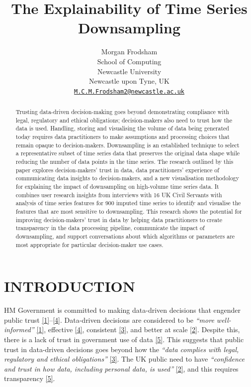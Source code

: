\documentclass{article}
\title{The Explainability of Time Series Downsampling}
\author{
    Morgan Frodsham
   \\
    School of Computing \\
    Newcastle University \\
  Newcastle upon Tyne, UK \\
  \texttt{\href{mailto:M.C.M.Frodsham2@newcastle.ac.uk}{\nolinkurl{M.C.M.Frodsham2@newcastle.ac.uk}}} \\
  }
\begin{document}
\maketitle


\begin{abstract}
Trusting data-driven decision-making goes beyond demonstrating
compliance with legal, regulatory and ethical obligations;
decision-makers also need to trust how the data is used. Handling,
storing and visualising the volume of data being generated today
requires data practitioners to make assumptions and processing choices
that remain opaque to decision-makers. Downsampling is an established
technique to select a representative subset of time series data that
preserves the original data shape while reducing the number of data
points in the time series. The research outlined by this paper explores
decision-makers' trust in data, data practitioners' experience of
communicating data insights to decision-makers, and a new visualisation
methodology for explaining the impact of downsampling on high-volume
time series data. It combines user research insights from interviews
with 16 UK Civil Servants with analysis of time series features for 900
imputed time series to identify and visualise the features that are most
sensitive to downsampling. This research shows the potential for
improving decision-makers' trust in data by helping data practitioners
to create transparency in the data processing pipeline, communicate the
impact of downsampling, and support conversations about which algorithms
or parameters are most appropriate for particular decision-maker use
cases.
\end{abstract}


\hypertarget{introduction}{%
\section{INTRODUCTION}\label{introduction}}

HM Government is committed to making data-driven decisions that engender
public trust
\protect\hyperlink{ref-data2017}{{[}1{]}}--\protect\hyperlink{ref-data2022}{{[}4{]}}.
Data-driven decisions are considered to be \emph{``more well-informed''}
\protect\hyperlink{ref-data2017}{{[}1{]}}, effective
\protect\hyperlink{ref-data2022}{{[}4{]}}, consistent
\protect\hyperlink{ref-data2021}{{[}3{]}}, and better at scale
\protect\hyperlink{ref-data2020}{{[}2{]}}. Despite this, there is a lack
of trust in government use of data
\protect\hyperlink{ref-trust}{{[}5{]}}. This suggests that public trust
in data-driven decisions goes beyond how the \emph{``data complies with
legal, regulatory and ethical obligations''}
\protect\hyperlink{ref-data2021}{{[}3{]}}. The UK public need to have
\emph{``confidence and trust in how data, including personal data, is
used''} \protect\hyperlink{ref-data2020}{{[}2{]}}, and this requires
transparency \protect\hyperlink{ref-trust}{{[}5{]}}.
\end{document}
